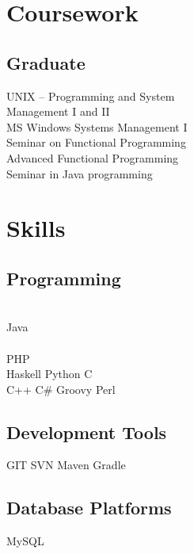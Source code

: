 \documentclass[a4paper]{deedy-resume}
\def\star{{\FA \faStar}}
\def\starEmpty{{\FAR \faStar}}
\begin{document}
\begin{minipage}[t]{0.32\textwidth}
\section{Coursework}
\subsection{Graduate}
\textbullet{} UNIX – Programming and System\\\hspace{5.7pt} Management I and II\\
\textbullet{} MS Windows Systems Management I\\
\textbullet{} Seminar on Functional Programming\\
\textbullet{} Advanced Functional Programming\\
\textbullet{} Seminar in Java programming\\
\sectionspace
\section{Skills}
\subsection{Programming}
\star\star\star\star\star\star\\
Java\\
\star\star\star\star\starEmpty\\
PHP\\
\location{\star\star\star\starEmpty\starEmpty}
Haskell \textbullet{} Python \textbullet{} C\\
\location{\star\starEmpty\starEmpty\starEmpty\starEmpty}
C++ \textbullet{} C\# \textbullet{} Groovy \textbullet{} Perl\\
\sectionspace
\subsection{Development Tools}
GIT \textbullet{} SVN \textbullet{} Maven \textbullet{} Gradle
\sectionspace
\subsection{Database Platforms}
MySQL
\end{minipage}
\hfill
\end{document}
